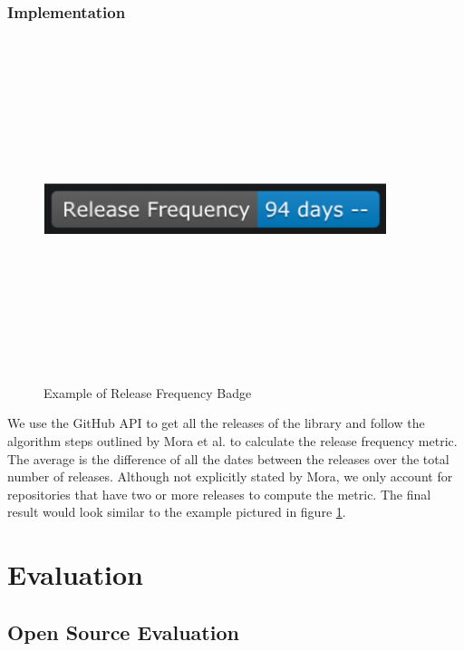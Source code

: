 \documentclass[12pt, letterpaper]{article}
\begin{document}
\subsubsection{Implementation}

\begin{figure}[!htb]
    \centerline{
        \includegraphics[width=10cm,height=10cm,keepaspectratio=true]{releasebadge}
    }
    \caption{
        Example of Release Frequency Badge
    }
    \label{releasebadge}
\end{figure}

We use the GitHub \cite{github} API to get all the releases of the library and follow the algorithm
steps outlined by Mora et al. \cite{metrics} to calculate the release frequency metric.
The average is the difference of all the dates between the releases over the total number of releases.
Although not explicitly stated by Mora, we only account for repositories that have two or more releases to compute
the metric. The final result would look similar to the example pictured in figure \ref{releasebadge}.


\section{Evaluation}

\subsection{Open Source Evaluation}
\end{document}
